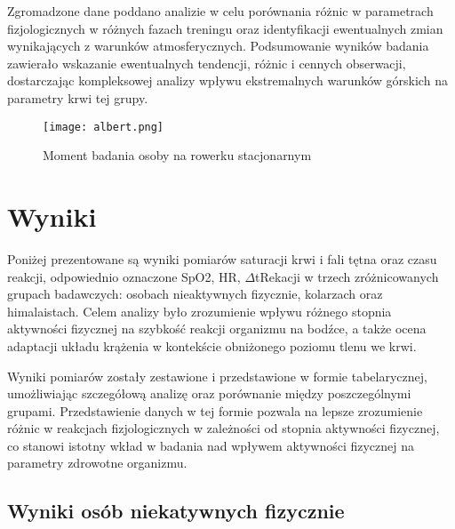 Zgromadzone dane poddano analizie w celu porównania różnic w parametrach fizjologicznych w różnych fazach treningu oraz identyfikacji ewentualnych zmian wynikających z warunków atmosferycznych. Podsumowanie wyników badania zawierało wskazanie ewentualnych tendencji, różnic i cennych obserwacji, dostarczając kompleksowej analizy wpływu ekstremalnych warunków górskich na parametry krwi tej grupy.

\begin{figure}[!htb]
    \centering
    \texttt{[image: albert.png]}
    \caption{Moment badania osoby na rowerku stacjonarnym}
\end{figure}
\newpage
\section{Wyniki}
Poniżej prezentowane są wyniki pomiarów saturacji krwi i fali tętna oraz czasu reakcji, odpowiednio oznaczone SpO2, HR, $\Delta$tRekacji w trzech zróżnicowanych grupach badawczych: osobach nieaktywnych fizycznie, kolarzach oraz himalaistach. Celem analizy było zrozumienie wpływu różnego stopnia aktywności fizycznej na szybkość reakcji organizmu na bodźce, a także ocena adaptacji układu krążenia w kontekście obniżonego poziomu tlenu we krwi.

Wyniki pomiarów zostały zestawione i przedstawione w formie tabelarycznej, umożliwiając szczegółową analizę oraz porównanie między poszczególnymi grupami. Przedstawienie danych w tej formie pozwala na lepsze zrozumienie różnic w reakcjach fizjologicznych w zależności od stopnia aktywności fizycznej, co stanowi istotny wkład w badania nad wpływem aktywności fizycznej na parametry zdrowotne organizmu.
\subsection{Wyniki osób niekatywnych fizycznie}

